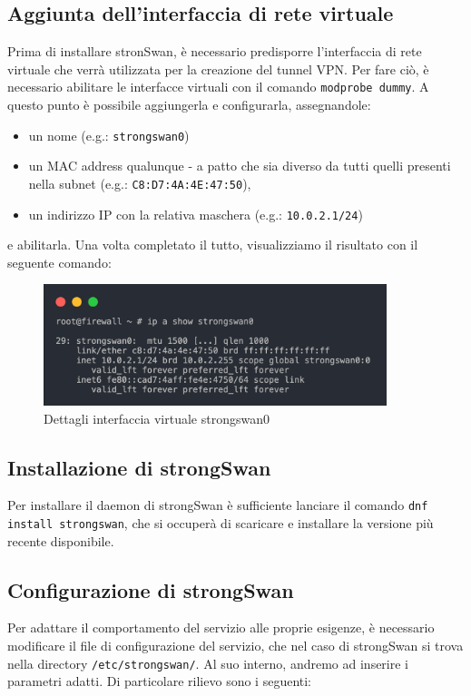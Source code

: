 \subsection{Aggiunta dell'interfaccia di rete virtuale}
Prima di installare stronSwan, è necessario predisporre l'interfaccia di rete virtuale che verrà utilizzata per la creazione del tunnel VPN. Per fare ciò, è necessario abilitare le interfacce virtuali con il comando \texttt{modprobe dummy}.
A questo punto è possibile aggiungerla e configurarla, assegnandole:
\begin{itemize}
    \item un nome (e.g.: \texttt{strongswan0})
    \item un MAC address qualunque - a patto che sia diverso da tutti quelli presenti nella subnet (e.g.: \texttt{C8:D7:4A:4E:47:50}),
    \item un indirizzo IP con la relativa maschera (e.g.: \texttt{10.0.2.1/24})
\end{itemize}
e abilitarla.
Una volta completato il tutto, visualizziamo il risultato con il seguente comando:
\begin{figure}[ht]
    \centering
    \includegraphics[width=10cm]{figure/show_sw0.png}
    \caption{Dettagli interfaccia virtuale strongswan0}
\end{figure}

\subsection{Installazione di strongSwan}
Per installare il daemon di strongSwan è sufficiente lanciare il comando \texttt{dnf install strongswan}, che si occuperà di scaricare e installare la versione più recente disponibile.

\subsection{Configurazione di strongSwan}
Per adattare il comportamento del servizio alle proprie esigenze, è necessario modificare il file di configurazione del servizio, che nel caso di strongSwan si trova nella directory \texttt{/etc/strongswan/}.
Al suo interno, andremo ad inserire i parametri adatti. Di particolare rilievo sono i seguenti:

